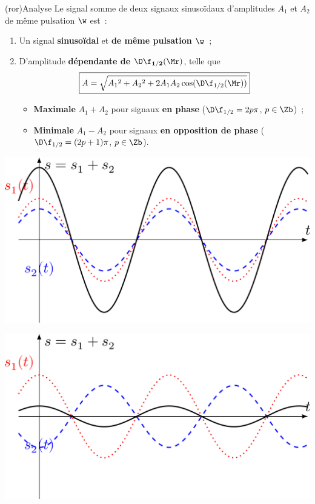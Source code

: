 \documentclass[../../main/main.tex]{subfiles}
\begin{document}
\begin{tcb}(ror){Analyse}
	Le signal somme de deux signaux sinusoïdaux d'amplitudes $A_1$ et $A_2$ de
	même pulsation $\w$ est~:
	\begin{enumerate}
		\item Un signal \textbf{sinusoïdal} et \textbf{de même pulsation
			      $\mathbf{\w}$}~;
		\item D'amplitude \textbf{dépendante de $\mathbf{\D\f_{1/2}(\Mr)}$}, telle que
		      \[\boxed{A = \sqrt{A_1{}^2+A_2{}^2 + 2A_1A_2\cos(\D\f_{1/2}(\Mr))}}\]
		      \begin{itemize}
			      \item \textbf{Maximale} $A_1 + A_2$ pour signaux \textbf{en
				            phase} ($\D\f_{1/2} = 2p\pi$, $p\in\Zb$)~;
			      \item \textbf{Minimale} $A_1 - A_2$ pour signaux \textbf{en
			            opposition de phase} ($\D\f_{1/2} = (2p+1)\pi$, $p\in\Zb$).
		      \end{itemize}
	\end{enumerate}
	\begin{minipage}{0.45\linewidth}
		\begin{center}
			\includegraphics[width=\linewidth]{somme_0}
			\label{fig:sommephase}
		\end{center}
	\end{minipage}
	\hfill
	\begin{minipage}{0.45\linewidth}
		\begin{center}
			\includegraphics[width=\linewidth]{somme_pi}
			\label{fig:sommeopp}
		\end{center}
	\end{minipage}
\end{tcb}
\end{document}
